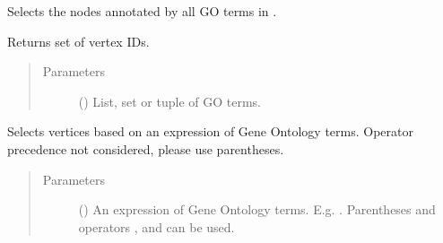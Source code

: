 \documentclass[letterpaper,10pt,english]{sphinxmanual}
\begin{document}
\begin{fulllineitems}
\begin{fulllineitems}
\label{\detokenize{reference:pypath.main.PyPath.select_by_go_all}}
Selects the nodes annotated by all GO terms in .

Returns set of vertex IDs.
\begin{quote}\begin{description}
\item[{Parameters}] \leavevmode
{} () \textendash{} List, set or tuple of GO terms.

\end{description}\end{quote}

\end{fulllineitems}


\begin{fulllineitems}
\label{\detokenize{reference:pypath.main.PyPath.select_by_go_expr}}
Selects vertices based on an expression of Gene Ontology terms.
Operator precedence not considered, please use parentheses.
\begin{quote}\begin{description}
\item[{Parameters}] \leavevmode
{} () \textendash{} An expression of Gene Ontology terms. E.g.
. Parentheses
and operators ,  and  can be used.

\end{description}\end{quote}

\end{fulllineitems}



\end{fulllineitems}
\end{document}
